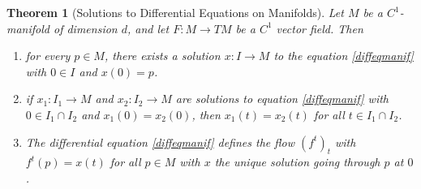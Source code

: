 \documentclass[11pt, a4paper]{memoir}
\theoremstyle{break}
\newtheorem{thm}{Theorem}
\theoremstyle{break}
\theoremstyle{nonumberplain}
\begin{document}
\begin{thm}[Solutions to Differential Equations on Manifolds]\label{ThmManifDiffEq}
Let $M$ be a $C^1$-manifold of dimension $d$, and let $F:M\to TM$ be a $C^1$ vector field. Then
\begin{enumerate}[label=(\roman*)]
	\item for every $p\in M$, there exists a solution $x:I\to M$ to the equation \ref{diffeqmanif} with $0\in I$ and $x(0)=p$.
	\item if $x_1:I_1\to M$ and $x_2:I_2\to M$ are solutions to equation \ref{diffeqmanif} with $0\in I_1\cap I_2$ and $x_1(0)=x_2(0)$, then $x_1(t)=x_2(t)$ for all $t\in I_1\cap I_2$.
	\item The differential equation \ref{diffeqmanif} defines the flow $(f^t)_t$ with $f^t(p)=x(t)$ for all $p\in M$ with $x$ the unique solution going through $p$ at $0$.
\end{enumerate}

\end{thm}
\end{document}

